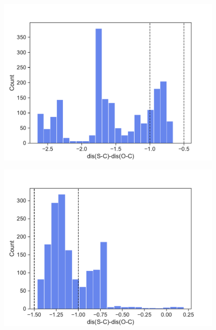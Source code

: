\documentclass[a4paper,8pt]{beamer}
\begin{document}
%
\begin{frame}
\frametitle{}
    \begin{figure}[ht]
        \begin{minipage}[b]{0.45\linewidth}
            \centering
            \includegraphics[width=\textwidth]{figures/window3.pdf}
            \label{fig:a}
        \end{minipage}
        \hspace{0.5cm}
        \begin{minipage}[b]{0.45\linewidth}
            \centering
            \includegraphics[width=\textwidth]{figures/window4.pdf}
            \label{fig:b}
        \end{minipage}
    \end{figure}
\end{frame}
\end{document}
